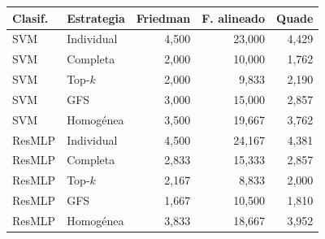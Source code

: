 \begin{resulttable}
\centering\fontsize{8}{10}\selectfont\setlength{\tabcolsep}{3.0pt}
\caption{Rankings medios de macro-F1 según Friedman, Friedman alineado y Quade con 22 descriptores. Seis datasets por clasificador; menor ranking indica mejor desempeño relativo dentro de cada prueba.}
\label{tab:classifier-rankings}
\begin{tabular}{@{}llrrr@{}}
\toprule
Clasif. & Estrategia & Friedman & F. alineado & Quade \\
\midrule
SVM & Individual & 4{,}500 & 23{,}000 & 4{,}429 \\
SVM & Completa & 2{,}000 & 10{,}000 & 1{,}762 \\
SVM & Top-$k$ & 2{,}000 & 9{,}833 & 2{,}190 \\
SVM & GFS & 3{,}000 & 15{,}000 & 2{,}857 \\
SVM & Homogénea & 3{,}500 & 19{,}667 & 3{,}762 \\
ResMLP & Individual & 4{,}500 & 24{,}167 & 4{,}381 \\
ResMLP & Completa & 2{,}833 & 15{,}333 & 2{,}857 \\
ResMLP & Top-$k$ & 2{,}167 & 8{,}833 & 2{,}000 \\
ResMLP & GFS & 1{,}667 & 10{,}500 & 1{,}810 \\
ResMLP & Homogénea & 3{,}833 & 18{,}667 & 3{,}952 \\
\bottomrule
\end{tabular}
\end{resulttable}
\FloatBarrier
